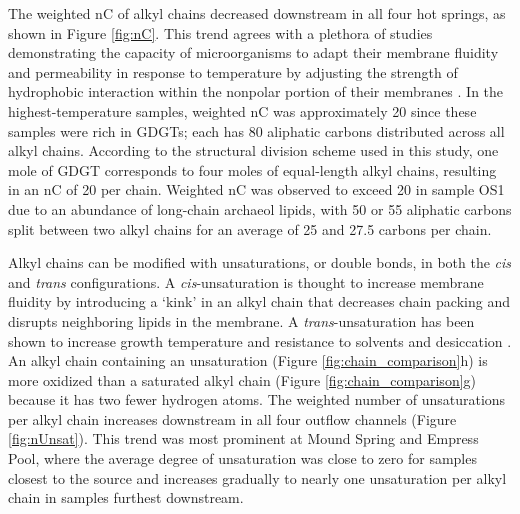 The weighted nC of alkyl chains decreased downstream in all four hot springs, as shown in Figure \ref{fig:nC}. This trend agrees with a plethora of studies demonstrating the capacity of microorganisms to adapt their membrane fluidity and permeability in response to temperature by adjusting the strength of hydrophobic interaction within the nonpolar portion of their membranes \citep[see review by][]{van2008membrane}. In the highest-temperature samples, weighted nC was approximately 20 since these samples were rich in GDGTs; each has 80 aliphatic carbons distributed across all alkyl chains. According to the structural division scheme used in this study, one mole of GDGT corresponds to four moles of equal-length alkyl chains, resulting in an nC of 20 per chain. Weighted nC was observed to exceed 20 in sample OS1 due to an abundance of long-chain archaeol lipids, with 50 or 55 aliphatic carbons split between two alkyl chains for an average of 25 and 27.5 carbons per chain.



Alkyl chains can be modified with unsaturations, or double bonds, in both the \textit{cis} and \textit{trans} configurations. A \textit{cis}-unsaturation is thought to increase membrane fluidity by introducing a `kink' in an alkyl chain that decreases chain packing and disrupts neighboring lipids in the membrane. A \textit{trans}-unsaturation has been shown to increase growth temperature \citep{kiran2005cis} and resistance to solvents and desiccation \citep{halverson2000differential}. An alkyl chain containing an unsaturation (Figure \ref{fig:chain_comparison}h) is more oxidized than a saturated alkyl chain (Figure \ref{fig:chain_comparison}g) because it has two fewer hydrogen atoms. The weighted number of unsaturations per alkyl chain increases downstream in all four outflow channels (Figure \ref{fig:nUnsat}). This trend was most prominent at Mound Spring and Empress Pool, where the average degree of unsaturation was close to zero for samples closest to the source and increases gradually to nearly one unsaturation per alkyl chain in samples furthest downstream.


